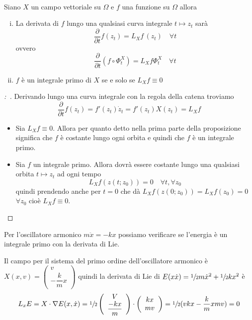 \documentclass[11pt,a4paper,twoside]{book}
\newenvironment{proposizione}[1][\empty]{\begin{Proposizione}{
\ifx\empty#1\relax\else\mdseries\itshape#1\\\fi
}{}}{\end{Proposizione}}
\newenvironment{esempio}[1][Esempio]{ 
  \begin{center}\begin{tcolorbox}[
  title={#1:\\},
  width=0.9\linewidth,
  flush right,
  enhanced jigsaw, 
  colback=white, 
  frame hidden, 
  sharpish corners, arc=3mm,
  borderline west = {1pt}{0pt}{gray},
  borderline south = {1pt}{0pt}{gray},
  coltitle=black, 
  fonttitle=\small\bfseries, 
  attach title to upper, 
  breakable,
  top=2.5pt, bottom=0.3pt]\small
  }{
 \normalsize \end{tcolorbox}\end{center}
}
\newenvironment{dimo}[1][\proofname]{
	\begin{tcolorbox}[
	breakable, 
	enhanced, 
	interior hidden, 
	frame hidden, 
	borderline west = {1pt}{0pt}{gray}, 
	top=0pt, bottom=0pt, left=0pt]
\begin{proof}[#1:~]
}
{
\end{proof}
\end{tcolorbox}
}
\theoremstyle{esss}
\theoremstyle{dotless}
\numberwithin{equation}{section} %
\begin{document}
\begin{proposizione}
Siano $X$ un campo vettoriale su $\Omega$ e $f$ una funzione su $\Omega$ allora
\begin{enumerate}[i.]
\item La derivata di $f$ lungo una qualsiasi curva integrale $t\mapsto z_t$ sarà
\[
\dfrac{\partial}{\partial t}f(z_t)=L_Xf\,(z_t) \quad \forall t
\]
ovvero
\[
\dfrac{\partial}{\partial t} ( f\circ\Phi^X_t )= L_Xf \Phi^X_t \quad \forall t
\]
\item $f$ è un integrale primo di $X$ se e solo se $L_Xf\equiv 0$
\end{enumerate}
\end{proposizione}
\begin{dimo}
Derivando lungo una curva integrale con la regola della catena troviamo  
\[
\dfrac{\partial}{\partial t}f(z_t)=f'(z_t)\dot{z}_t=f'(z_t)X(z_t)=L_Xf
\]
\begin{itemize}
\item Sia $L_Xf\equiv 0$. 
Allora per quanto detto nella prima parte della proposizione significa che $f$ è costante lungo ogni orbita e quindi che $f$ è un integrale primo.
\item  Sia $f$ un integrale primo. 
Allora dovrà essere costante lungo una qualsiasi orbita $t\mapsto z_t$ ad ogni tempo 
\[
L_Xf\left(z(t;z_0)\right)=0 \quad \forall t, \forall z_0
\]
quindi prendendo anche per $t=0$ che dà $L_Xf\left(z(0;z_0)\right)=L_Xf(z_0)=0$ $\forall z_0$ cioè $L_Xf\equiv 0$.\qedhere
\end{itemize}
\end{dimo}

\begin{esempio}
Per l'oscillatore armonico $m\ddot{x}=-kx$ possiamo verificare se l'energia è un integrale primo con la derivata di Lie.

Il campo per il sistema del primo ordine dell'oscillatore armonico è $X(x,v)=\left(\begin{array}{c} v \\ -\dfrac{k}{m} x \end{array}\right)$ quindi la derivata di Lie di $E(x\dot{x})=\sfrac{1}{2} m\dot{x}^2 +\sfrac{1}{2}kx^2$ è
\[
L_x E= X\cdot\nabla E(x,\dot{x}) =\sfrac{1}{2}\left(\begin{array}{c}
V \\ \dfrac{-kx}{m} \end{array}\right) \cdot \left(\begin{array}{c}
kx \\ mv \end{array}\right) = \sfrac{1}{2} (vkx - \dfrac{k}{m}xmv)=0
\]
\end{esempio}
\end{document}
